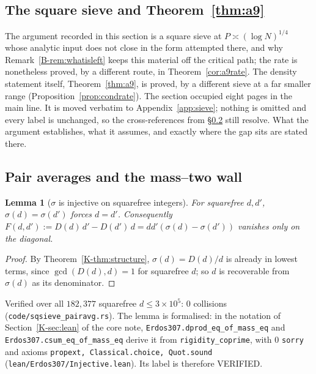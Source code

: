 \documentclass[11pt]{article}
\newtheorem{lemma}[theorem]{Lemma}
\theoremstyle{definition}
\begin{document}
\subsection{The square sieve and Theorem~\ref{thm:a9}}\label{ssec:sieve}

The argument recorded in this section is a square sieve at $P\asymp(\log N)^{1/4}$ whose analytic
input does not close in the form attempted there, and why Remark~\ref{B-rem:whatisleft} keeps this
material off the critical path; the rate is nonetheless proved, by a different route, in
Theorem~\ref{cor:a9rate}.
The density statement itself, Theorem~\ref{thm:a9}, is proved, by a different sieve at a far smaller
range (Proposition~\ref{prop:condrate}). The section occupied eight pages in the main line. It is
moved verbatim to Appendix~\ref{app:sieve}; nothing is omitted and every label is unchanged, so the
cross-references from \S\ref{ssec:pairavg} still resolve. What the argument establishes, what it
assumes, and exactly where the gap sits are stated there.

\subsection{Pair averages and the mass--two wall}\label{ssec:pairavg}

\begin{lemma}[$\sigma$ is injective on squarefree integers]\label{lem:sigmainj}
For squarefree $d,d'$, $\sigma(d)=\sigma(d')$ forces $d=d'$. Consequently
$F(d,d'):=D(d)\,d'-D(d')\,d=dd'(\sigma(d)-\sigma(d'))$ vanishes only on the diagonal.
\end{lemma}
\begin{proof}
By Theorem~\ref{K-thm:structure}, $\sigma(d)=D(d)/d$ is already in lowest terms, since
$\gcd(D(d),d)=1$ for squarefree $d$; so $d$ is recoverable from $\sigma(d)$ as its denominator.
\end{proof}
Verified over all $182{,}377$ squarefree $d\le3\times10^5$: $0$ collisions
\textup{(\texttt{code/sqsieve\_pairavg.rs})}. The lemma is formalised: in the notation of
Section~\ref{K-sec:lean} of the core note, \texttt{Erdos307.dprod\_eq\_of\_mass\_eq} and
\texttt{Erdos307.csum\_eq\_of\_mass\_eq} derive it from \texttt{rigidity\_coprime}, with $0$
\texttt{sorry} and axioms \texttt{propext, Classical.choice, Quot.sound}
\textup{(\texttt{lean/Erdos307/Injective.lean})}. Its label is therefore \textup{VERIFIED}.
\end{document}
